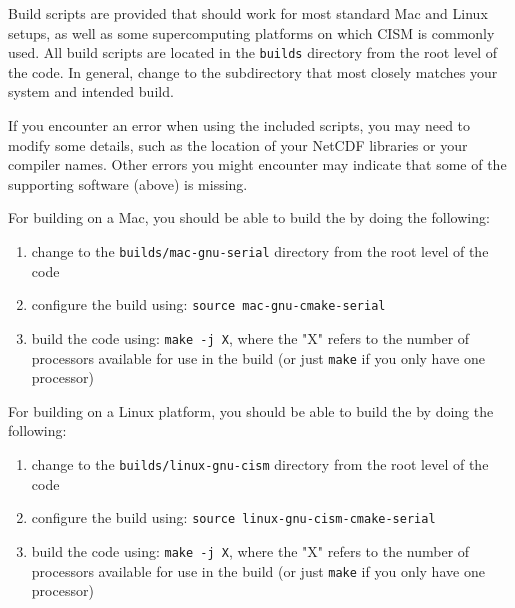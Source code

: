 Build scripts are provided that should work for most standard Mac and Linux setups, 
as well as some supercomputing platforms on which CISM is commonly used.
All build scripts are located in the \texttt{builds} directory from the root level of the code.
In general, change to the subdirectory that most closely matches your system and intended
build.

If you encounter an error when using the included scripts, 
you may need to modify some details, such as the location of your NetCDF libraries 
or your compiler names.  Other errors you might encounter may indicate that some of
the supporting software (above) is missing.


\begin{mdframed}[style=mac] %
For building on a Mac, you should be able to build the by doing the following:

\begin{enumerate}
\item{change to the \texttt{builds/mac-gnu-serial} directory from the root level of the code}
\item{configure the build using: \texttt{source mac-gnu-cmake-serial}}
\item{build the code using: \texttt{make -j X}, where the "X" refers to the number of processors available for use in the build (or just \texttt{make} if you only have one processor)}
\end{enumerate}
\end{mdframed}              %


\begin{mdframed}[style=ubuntu] %
For building on a Linux platform, you should be able to build the by doing the following:

\begin{enumerate}
\item{change to the \texttt{builds/linux-gnu-cism} directory from the root level of the code}
\item{configure the build using: \texttt{source linux-gnu-cism-cmake-serial}}
\item{build the code using: \texttt{make -j X}, where the "X" refers to the number of processors available for use in the build (or just \texttt{make} if you only have one processor)}
\end{enumerate}
\end{mdframed}                 %




